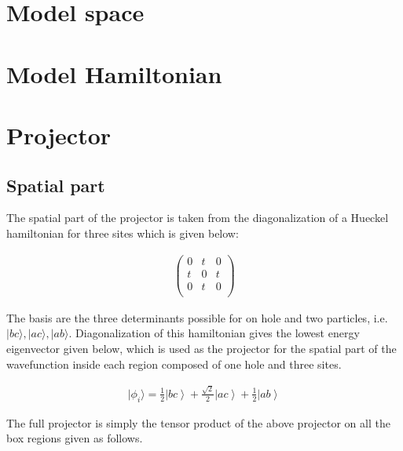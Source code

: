 \documentclass[12pt,twoside]{report}
\begin{document}
	\section{Model space}
	
	\section{Model Hamiltonian}
	
	\section{Projector}

	\subsection{Spatial part}

	The spatial part of the projector is taken from the diagonalization of a
	Hueckel hamiltonian for three sites which is given below:

	\begin{equation}
		\begin{split}
			 \begin{pmatrix}
			   0 & t & 0 \\
			   t & 0 & t \\
			   0 & t & 0 \\
			 \end{pmatrix}
		\end{split}
		\label{eq:demodel}
	\end{equation}

	The basis are the three determinants possible for on hole and two particles,
	i.e. $|bc\rangle,|ac\rangle,|ab\rangle$.  Diagonalization of this
	hamiltonian gives the lowest energy eigenvector given below, which is used
	as the projector for the spatial part of the wavefunction inside each region
	composed of one hole and three sites.

	\begin{equation}
		\begin{split}
		  |\phi_{i}\rangle = \frac{1}{2}\left| bc\right\rangle +
\frac{\sqrt{2}}{2}\left| ac\right\rangle +
\frac{1}{2}\left| ab\right\rangle
		\end{split}
		\label{eq:demodel}
	\end{equation}

	The full projector is simply the tensor product of the above projector
	on all the box regions given as follows.
\end{document}
